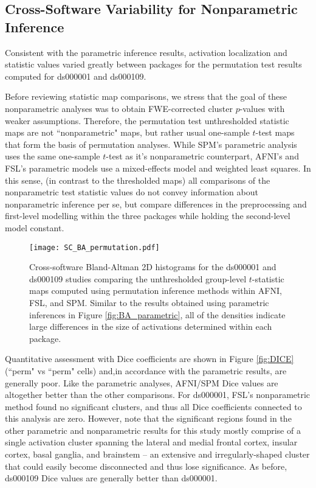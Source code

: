 \subsection{Cross-Software Variability for Nonparametric Inference}

Consistent with the parametric inference results, activation localization and statistic values varied greatly between packages for the permutation test results computed for ds000001 and ds000109.

Before reviewing statistic map comparisons, we stress that the goal of these nonparametric analyses was to obtain FWE-corrected cluster $p$-values with weaker assumptions. Therefore, the permutation test unthresholded statistic maps are not ``nonparametric" maps, but rather usual one-sample $t$-test maps that form the basis of permutation analyses. While SPM's parametric analysis uses the same one-sample $t$-test as it's nonparametric counterpart, AFNI's and FSL's parametric models use a mixed-effects model and weighted least squares. In this sense, (in contrast to the thresholded maps) all comparisons of the nonparametric test statistic values do not convey information about nonparametric inference per se, but compare differences in the preprocessing and first-level modelling within the three packages while holding the second-level model constant.

\begin{figure}[htbp]
\centering
	\texttt{[image: SC\_BA\_permutation.pdf]}	
\caption{Cross-software Bland-Altman 2D histograms for the ds000001 and ds000109 studies comparing the unthresholded group-level $t$-statistic maps computed using permutation inference methods within AFNI, FSL, and SPM. Similar to the results obtained using parametric inferences in Figure \ref{fig:BA_parametric}, all of the densities indicate large differences in the size of activations determined within each package.}
\label{fig:BA_permutation}
\end{figure}

Quantitative assessment with Dice coefficients are shown in Figure \ref{fig:DICE} (``perm" vs ``perm" cells) and,in accordance with the parametric results, are generally poor. Like the parametric analyses, AFNI/SPM Dice values are altogether better than the other comparisons. For ds000001, FSL's nonparametric method found no significant clusters, and thus all Dice coefficients connected to this analysis are zero. However, note that the significant regions found in the other parametric and nonparametric results for this study mostly comprise of a single activation cluster spanning the lateral and medial frontal cortex, insular cortex, basal ganglia, and brainstem -- an extensive and irregularly-shaped cluster that could easily become disconnected and thus lose significance. As before, ds000109 Dice values are generally better than ds000001.

